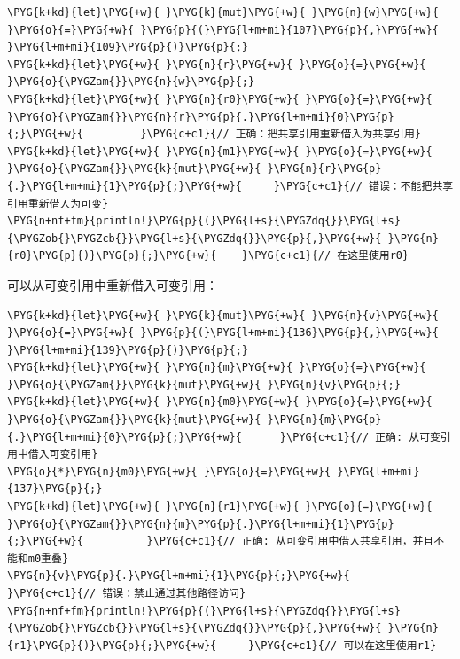 \begin{Verbatim}[commandchars=\\\{\},breaklines=true,breakanywhere=true,fontsize=\codefont,xleftmargin=17bp]
\PYG{k+kd}{let}\PYG{+w}{ }\PYG{k}{mut}\PYG{+w}{ }\PYG{n}{w}\PYG{+w}{ }\PYG{o}{=}\PYG{+w}{ }\PYG{p}{(}\PYG{l+m+mi}{107}\PYG{p}{,}\PYG{+w}{ }\PYG{l+m+mi}{109}\PYG{p}{)}\PYG{p}{;}
\PYG{k+kd}{let}\PYG{+w}{ }\PYG{n}{r}\PYG{+w}{ }\PYG{o}{=}\PYG{+w}{ }\PYG{o}{\PYGZam{}}\PYG{n}{w}\PYG{p}{;}
\PYG{k+kd}{let}\PYG{+w}{ }\PYG{n}{r0}\PYG{+w}{ }\PYG{o}{=}\PYG{+w}{ }\PYG{o}{\PYGZam{}}\PYG{n}{r}\PYG{p}{.}\PYG{l+m+mi}{0}\PYG{p}{;}\PYG{+w}{         }\PYG{c+c1}{// 正确：把共享引用重新借入为共享引用}
\PYG{k+kd}{let}\PYG{+w}{ }\PYG{n}{m1}\PYG{+w}{ }\PYG{o}{=}\PYG{+w}{ }\PYG{o}{\PYGZam{}}\PYG{k}{mut}\PYG{+w}{ }\PYG{n}{r}\PYG{p}{.}\PYG{l+m+mi}{1}\PYG{p}{;}\PYG{+w}{     }\PYG{c+c1}{// 错误：不能把共享引用重新借入为可变}
\PYG{n+nf+fm}{println!}\PYG{p}{(}\PYG{l+s}{\PYGZdq{}}\PYG{l+s}{\PYGZob{}\PYGZcb{}}\PYG{l+s}{\PYGZdq{}}\PYG{p}{,}\PYG{+w}{ }\PYG{n}{r0}\PYG{p}{)}\PYG{p}{;}\PYG{+w}{    }\PYG{c+c1}{// 在这里使用r0}
\end{Verbatim}

可以从可变引用中重新借入可变引用：

\begin{Verbatim}[commandchars=\\\{\},breaklines=true,breakanywhere=true,fontsize=\codefont,xleftmargin=17bp]
\PYG{k+kd}{let}\PYG{+w}{ }\PYG{k}{mut}\PYG{+w}{ }\PYG{n}{v}\PYG{+w}{ }\PYG{o}{=}\PYG{+w}{ }\PYG{p}{(}\PYG{l+m+mi}{136}\PYG{p}{,}\PYG{+w}{ }\PYG{l+m+mi}{139}\PYG{p}{)}\PYG{p}{;}
\PYG{k+kd}{let}\PYG{+w}{ }\PYG{n}{m}\PYG{+w}{ }\PYG{o}{=}\PYG{+w}{ }\PYG{o}{\PYGZam{}}\PYG{k}{mut}\PYG{+w}{ }\PYG{n}{v}\PYG{p}{;}
\PYG{k+kd}{let}\PYG{+w}{ }\PYG{n}{m0}\PYG{+w}{ }\PYG{o}{=}\PYG{+w}{ }\PYG{o}{\PYGZam{}}\PYG{k}{mut}\PYG{+w}{ }\PYG{n}{m}\PYG{p}{.}\PYG{l+m+mi}{0}\PYG{p}{;}\PYG{+w}{      }\PYG{c+c1}{// 正确: 从可变引用中借入可变引用}
\PYG{o}{*}\PYG{n}{m0}\PYG{+w}{ }\PYG{o}{=}\PYG{+w}{ }\PYG{l+m+mi}{137}\PYG{p}{;}
\PYG{k+kd}{let}\PYG{+w}{ }\PYG{n}{r1}\PYG{+w}{ }\PYG{o}{=}\PYG{+w}{ }\PYG{o}{\PYGZam{}}\PYG{n}{m}\PYG{p}{.}\PYG{l+m+mi}{1}\PYG{p}{;}\PYG{+w}{          }\PYG{c+c1}{// 正确: 从可变引用中借入共享引用，并且不能和m0重叠}
\PYG{n}{v}\PYG{p}{.}\PYG{l+m+mi}{1}\PYG{p}{;}\PYG{+w}{                    }\PYG{c+c1}{// 错误：禁止通过其他路径访问}
\PYG{n+nf+fm}{println!}\PYG{p}{(}\PYG{l+s}{\PYGZdq{}}\PYG{l+s}{\PYGZob{}\PYGZcb{}}\PYG{l+s}{\PYGZdq{}}\PYG{p}{,}\PYG{+w}{ }\PYG{n}{r1}\PYG{p}{)}\PYG{p}{;}\PYG{+w}{     }\PYG{c+c1}{// 可以在这里使用r1}
\end{Verbatim}


